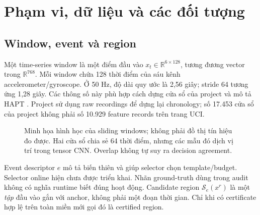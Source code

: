 \documentclass[11pt,a4paper]{article}
\newcommand{\R}{\mathbb{R}}
\newcommand{\Sset}{\mathcal{S}}
\begin{document}
\section{Phạm vi, dữ liệu và các đối tượng}
\subsection{Window, event và region}
Một time-series window là một điểm đầu vào
\(x_t\in\R^{6\times128}\), tương đương vector trong \(\R^{768}\).
Mỗi window chứa 128 thời điểm của sáu kênh accelerometer/gyroscope.
Ở 50 Hz, độ dài quy ước là 2,56 giây; stride 64 tương ứng 1,28 giây.
Các thông số này phù hợp cách dựng cửa sổ của project và mô tả HAPT
\cite{hapt}. Project sử dụng raw recordings để dựng lại chronology; số
17.453 cửa sổ của project không phải số 10.929 feature records trên trang UCI.

\begin{figure}[ht]
\centering
{}
\caption{Minh họa hình học của sliding windows; không phải đồ thị tín hiệu
đo được. Hai cửa sổ chia sẻ 64 thời điểm, nhưng các mẫu đó dịch vị trí trong
tensor CNN. Overlap không tự suy ra decision agreement.}
\end{figure}

Event descriptor \(e\) mô tả biến thiên và giúp selector chọn template/budget.
Selector online hiện chưa được triển khai. Nhãn ground-truth dùng trong
audit không có nghĩa runtime biết đúng hoạt động.
Candidate region \(\Sset_e(x^r)\) là một \emph{tập} đầu vào gắn với anchor,
không phải một đoạn thời gian. Chỉ khi có certificate hợp lệ trên toàn miền
mới gọi đó là certified region.
\end{document}
